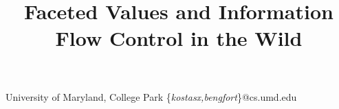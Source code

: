 \documentclass[preprint]{sigplanconf}
\begin{document}
\setlength{\pdfpageheight}{\paperheight}
\setlength{\pdfpagewidth}{\paperwidth}




\title{Faceted Values and Information Flow Control in the Wild}

           {University of Maryland, College Park}
           {\{\textit{kostasx,bengfort}\}@cs.umd.edu}

\maketitle
\end{document}
